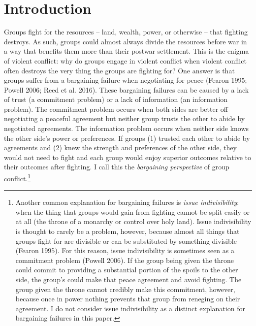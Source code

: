 \documentclass[11pt]{article}
\begin{document}
\hypertarget{introduction}{%
\section{Introduction}\label{introduction}}

Groups fight for the resources -- land, wealth, power, or otherwise --
that fighting destroys. As such, groups could almost always divide the
resources before war in a way that benefits them more than their postwar
settlement. This is the enigma of violent conflict: why do groups engage
in violent conflict when violent conflict often destroys the very thing
the groups are fighting for? One answer is that groups suffer from a
bargaining failure when negotiating for peace (Fearon 1995; Powell 2006;
Reed et al. 2016). These bargaining failures can be caused by a lack of
trust (a commitment problem) or a lack of information (an information
problem). The commitment problem occurs when both sides are better off
negotiating a peaceful agreement but neither group trusts the other to
abide by negotiated agreements. The information problem occurs when
neither side knows the other side's power or preferences. If groups (1)
trusted each other to abide by agreements and (2) knew the strength and
preferences of the other side, they would not need to fight and each
group would enjoy superior outcomes relative to their outcomes after
fighting. I call this the \emph{bargaining perspective} of group
conflict.\footnote{Another common explanation for bargaining failures is
  \emph{issue indivisibility}: when the thing that groups would gain
  from fighting cannot be split easily or at all (the throne of a
  monarchy or control over holy land). Issue indivisibility is thought
  to rarely be a problem, however, because almost all things that groups
  fight for are divisible or can be substituted by something divisible
  (Fearon 1995). For this reason, issue indivisibility is sometimes seen
  as a commitment problem (Powell 2006). If the group being given the
  throne could commit to providing a substantial portion of the spoils
  to the other side, the group's could make that peace agreement and
  avoid fighting. The group given the throne cannot credibly make this
  commitment, however, because once in power nothing prevents that group
  from reneging on their agreement. I do not consider issue
  indivisibility as a distinct explanation for bargaining failures in
  this paper.}
\end{document}
